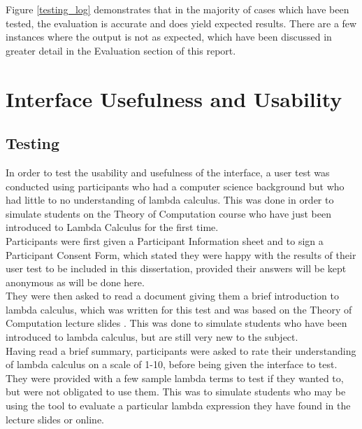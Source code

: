 \documentclass[a4paper,11pt]{report}
\begin{document}
Figure \ref{testing_log} demonstrates that in the majority of cases which have been tested, the evaluation is accurate and does yield expected results. There are a few instances where the output is not as expected, which have been discussed in greater detail in the Evaluation section of this report.

\section{Interface Usefulness and Usability}
\label{interface usefulness and usability}
\subsection{Testing}

In order to test the usability and usefulness of the interface, a user test was conducted using participants who had a computer science background but who had little to no understanding of lambda calculus. This was done in order to simulate students on the Theory of Computation course who have just been introduced to Lambda Calculus for the first time.\\

Participants were first given a Participant Information sheet and to sign a Participant Consent Form, which stated they were happy with the results of their user test to be included in this dissertation, provided their answers will be kept anonymous as will be done here.\\

They were then asked to read a document giving them a brief introduction to lambda calculus, which was written for this test and was based on the Theory of Computation lecture slides \cite{Gay2019}. This was done to simulate students who have been introduced to lambda calculus, but are still very new to the subject.\\

Having read a brief summary, participants were asked to rate their understanding of lambda calculus on a scale of 1-10, before being given the interface to test. They were provided with a few sample lambda terms to test if they wanted to, but were not obligated to use them. This was to simulate students who may be using the tool to evaluate a particular lambda expression they have found in the lecture slides or online.\\
\end{document}
